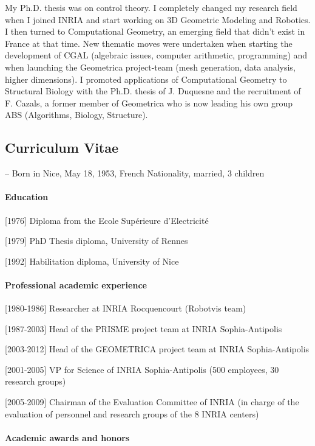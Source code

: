 My Ph.D. thesis was on control theory. I completely changed my research field when I joined INRIA and start working on 3D Geometric Modeling and Robotics. I then turned to Computational Geometry, an emerging field that didn't exist in France at that time.  New thematic moves were undertaken when starting the development of CGAL (algebraic issues, computer arithmetic, programming) and when launching the Geometrica project-team (mesh generation, data analysis, higher dimensions).  I promoted applications of Computational Geometry to Structural Biology with the Ph.D. thesis of J. Duquesne and the recruitment of F. Cazals, a former member of Geometrica who is now leading his own group ABS (Algorithms, Biology, Structure).

\newpage

\subsection{Curriculum Vitae}

-- Born in Nice, May 18, 1953, French Nationality, married, 3 children

\paragraph{Education}\mbox{}

[1976]  Diploma  from the Ecole Sup\'erieure d'Electricit\'e

[1979] PhD Thesis diploma, University of Rennes

[1992]  Habilitation diploma, University of Nice

\paragraph{Professional academic experience}\mbox{}

[1980-1986] Researcher  at INRIA Rocquencourt (Robotvis team)

[1987-2003] Head of the PRISME project team at  INRIA Sophia-Antipolis

[2003-2012] Head of the GEOMETRICA project team at  INRIA Sophia-Antipolis

[2001-2005] VP for Science  of INRIA Sophia-Antipolis (500 employees, 30 research groups)

[2005-2009] Chairman of the Evaluation Committee of INRIA (in charge of the evaluation of personnel and research groups of the 8 INRIA centers)

\paragraph{Academic awards and honors}\mbox{}

